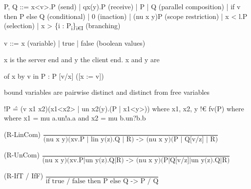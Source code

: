 \documentclass[landscape, a4paper]{article}
\begin{document}
\begin{minipage}[t]{0.195\linewidth}
	\begin{betterlist}
		\item {} P, Q ::= x<v>.P (send) | qx(y).P (receive) | P | Q (parallel composition) | if v then P else Q (conditional) | 0 (inaction) | (nu x y)P (scope restriction) | x < l.P (selection) | x > \{i : P\textsubscript{i}\}\textsubscript{i€I} (branching)
		\item {} v ::= x (variable) | true | false (boolean values)
		\item x is the server end and y the client end. x and y are 
		\begin{betterlist}
			\item {} of x by v in P : P [v/x] ([x := v])
			\item {} bound variables are pairwise distinct and distinct from free variables
			\item !P \^= (v x1 x2)(x1<x2> | un x2(y).(P | x1<y>)) where x1, x2, y !€ fv(P) where where x1 = mu a.un!a.a and x2 = mu b.un?b.b
		\end{betterlist}
		\item \nul{Reduction rules (P -> P):}
		\begin{betterlist}
			\item (R-LinCom) $\dfrac{}{\text{(nu x y)(xv.P | lin y(z).Q | R) -> (nu x y)(P | Q[v/z] | R)}}$
			\item (R-UnCom) $\dfrac{}{\text{(nu x y)(xv.P|un y(z).Q|R) -> (nu x y)(P|Q[v/z]|un y(z).Q|R)}}$
			\item (R-IfT / IfF) $\dfrac{}{\text{if true / false then P else Q -> P / Q}}$

\end{betterlist}
\end{betterlist}
\end{minipage}
\end{document}
